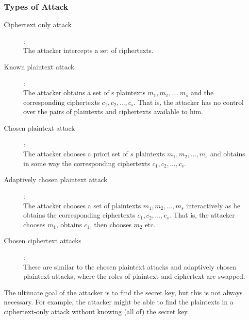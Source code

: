 \subsubsection{Types of Attack}

\begin{description}
\item[Ciphertext only attack]:\\
  The attacker intercepts a set of ciphertexts.
\item[Known plaintext attack]:\\
  The attacker obtains a set of s plaintexts $m_1 , m_2 , \ldots, m_s$
  and the corresponding ciphertexts $c_1 , c_2 , \ldots, c_s$. That
  is, the attacker has no control over the pairs of plaintexts and
  ciphertexts available to him.
\item[Chosen plaintext attack]:\\
  The attacker chooses a priori set of $s$ plaintexts $m_1 , m_2 ,
  \ldots, m_s$ and obtains in some way the corresponding ciphertexts
  $c_1 , c_2 , \ldots, c_s$.
\item[Adaptively chosen plaintext attack]:\\
  The attacker chooses a set of plaintexts $m_1 , m_2 , \ldots, m_s$
  interactively as he obtains the corresponding ciphertexts $c_1 , c_2
  , \ldots, c_s$. That is, the attacker chooses $m_1$, obtains $c_1$,
  then chooses $m_2$ etc.
\item[Chosen ciphertext attacks]:\\
  These are similar to the chosen plaintext attacks and adaptively
  chosen plaintext attacks, where the roles of plaintext and
  ciphertext are swapped.
\end{description}

The ultimate goal of the attacker is to find the secret key, but this
is not always necessary. For example, the attacker might be able to
find the plaintexts in a ciphertext-only attack without knowing (all
of) the secret key.
